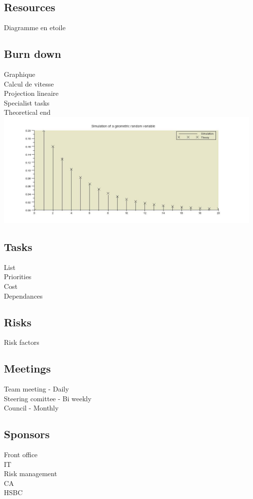 \documentclass[8pt]{article} %
\begin{document}
\subsection{Resources}
Diagramme en etoile\\

\subsection{Burn down}
Graphique\\
Calcul de vitesse\\
Projection lineaire\\
Specialist tasks\\
Theoretical end\\

\includegraphics[width=200pts]{Geometric.jpg}

\subsection{Tasks}
List\\
Priorities\\
Cost \\
Dependances\\

\subsection{Risks}
Risk factors\\

\subsection{Meetings}
Team meeting - Daily\\
Steering comittee - Bi weekly\\
Council - Monthly\\

\subsection{Sponsors}
Front office\\
IT\\
Risk management\\
CA\\
HSBC\\
\end{document}
